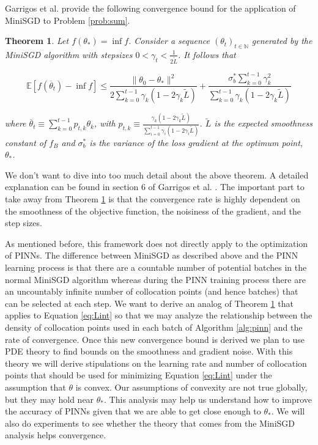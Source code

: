 \documentclass[12pt]{article}
\newtheorem{theorem}{Theorem}
\begin{document}
Garrigos et al. \cite{gd} provide the following convergence bound for the application of MiniSGD to Problem \ref{prob:sum}.

\begin{theorem} \label{thm:sgd}
    Let $f(\theta_*) = \inf f$. Consider a sequence $(\theta_t)_{t \in \mathbb{N}}$ generated by the MiniSGD algorithm with stepsizes $0 < \gamma_t < \frac{1}{2 \tilde{L}}$. It follows that

    \begin{equation}
        \mathbb{E}[f(\overline{\theta}_t) - \inf f] \leq \frac{\|\theta_0 - \theta_*\|^2}{2 \sum_{k=0}^{t-1} \gamma_k(1-2\gamma_k \tilde{L})} + \frac{\sigma_b^* \sum_{k=0}^{t-1} \gamma_k^2}{\sum_{k=0}^{t-1} \gamma_k (1 - 2 \gamma_k \tilde{L})} 
    \end{equation}

    where $\overline{\theta}_t \equiv \sum_{k=0}^{t-1} p_{t,k} \theta_k$, with $p_{t,k} \equiv \frac{\gamma_k (1 - 2 \gamma_k \tilde{L})}{\sum_{i=0}^{t-1} \gamma_i (1 - 2 \gamma_i \tilde{L})}$. $\tilde{L}$ is the expected smoothness constant of $f_B$ and $\sigma_b^*$ is the variance of the loss gradient at the optimum point, $\theta_*$.
\end{theorem}

We don't want to dive into too much detail about the above theorem. A detailed explanation can be found in section 6 of Garrigos et al. \cite{gd}. The important part to take away from Theorem \ref{thm:sgd} is that the convergence rate is highly dependent on the smoothness of the objective function, the noisiness of the gradient, and the step sizes. 

As mentioned before, this framework does not directly apply to the optimization of PINNs. The difference between MiniSGD as described above and the PINN learning process is that there are a countable number of potential batches in the normal MiniSGD algorithm whereas during the PINN training process there are an uncountably infinite number of collocation points (and hence batches) that can be selected at each step. We want to derive an analog of Theorem \ref{thm:sgd} that applies to Equation \ref{eq:Lint} so that we may analyze the relationship between the density of collocation points used in each batch of Algorithm \ref{alg:pinn} and the rate of convergence. Once this new convergence bound is derived we plan to use PDE theory to find bounds on the smoothness and gradient noise. With this theory we will derive stipulations on the learning rate and number of collocation points that should be used for minimizing Equation \ref{eq:Lint} under the assumption that $\theta$ is convex. Our assumptions of convexity are not true globally, but they may hold near $\theta_*$. This analysis may help us understand how to improve the accuracy of PINNs given that we are able to get close enough to $\theta_*$. We will also do experiments to see whether the theory that comes from the MiniSGD analysis helps convergence.
\end{document}

